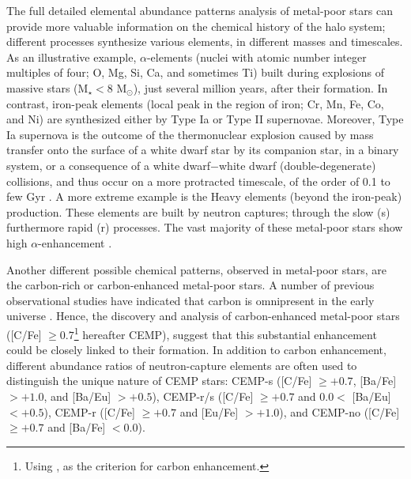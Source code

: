 The full detailed elemental abundance patterns analysis of metal-poor stars can provide more valuable information on the chemical history of the halo system; different processes synthesize various elements, in different masses and timescales. As an illustrative example, $\alpha$-elements (nuclei with atomic number integer multiples of four; O, Mg, Si, Ca, and sometimes Ti) built during explosions of massive stars (M$_{\star} < 8$ M$_{\odot}$), just several million years, after their formation. In contrast, iron-peak elements (local peak in the region of iron; Cr, Mn, Fe, Co, and Ni) are synthesized either by Type Ia or Type II supernovae. Moreover, Type Ia supernova is the outcome of the thermonuclear explosion caused by mass transfer onto the surface of a white dwarf star by its companion star, in a binary system, or a consequence of a white dwarf$-$white dwarf (double-degenerate) collisions, and thus occur on a more protracted timescale, of the order of 0.1 to few Gyr \citep{2001ApJ...558..351M}. A more extreme example is the Heavy elements (beyond the iron-peak) production. These elements are built by neutron captures; through the slow (s) furthermore rapid (r) processes. The vast majority of these metal-poor stars show high $\alpha$-enhancement \citep[typically $\alpha$-to-iron ratio $\sim$ $+0.4$,][]{1989ARA&A..27..279W, 1994A&A...285..440N, 2000A&A...356..238C}.



Another different possible chemical patterns, observed in metal-poor stars, are the carbon-rich or carbon-enhanced metal-poor \citep[CEMP; carbon-to-iron ratio $> 1.0$ dex][]{2005ARA&A..43..531B} stars. A number of previous observational studies have indicated that carbon is
omnipresent in the early universe \citep{2005ARA&A..43..531B,
2007ApJ...655..492A, 2016A&A...588A..37H, 2016ApJ...829L..24P,
2018MNRAS.475.4781C, 2018A&A...614A..68C}. Hence, the discovery and analysis of
carbon-enhanced metal-poor stars ([C/Fe] $\geqslant 0.7$\footnote{Using
\citet{2007ApJ...655..492A}, as the criterion for carbon enhancement.}
hereafter CEMP), suggest that this substantial enhancement could be closely
linked to their formation.  In addition to carbon enhancement, different
abundance ratios of neutron-capture elements are often used to distinguish the
unique nature of CEMP stars:  CEMP-s ([C/Fe] $\geqslant +0.7$, [Ba/Fe] $>
+1.0$, and [Ba/Eu] $> +0.5$),  CEMP-r/s ([C/Fe] $\geqslant +0.7$ and $0.0 <$
[Ba/Eu] $< +0.5$),  CEMP-r ([C/Fe] $\geqslant +0.7$ and [Eu/Fe] $> +1.0$), and
CEMP-no ([C/Fe] $\geqslant +0.7$ and [Ba/Fe] $< 0.0$).

